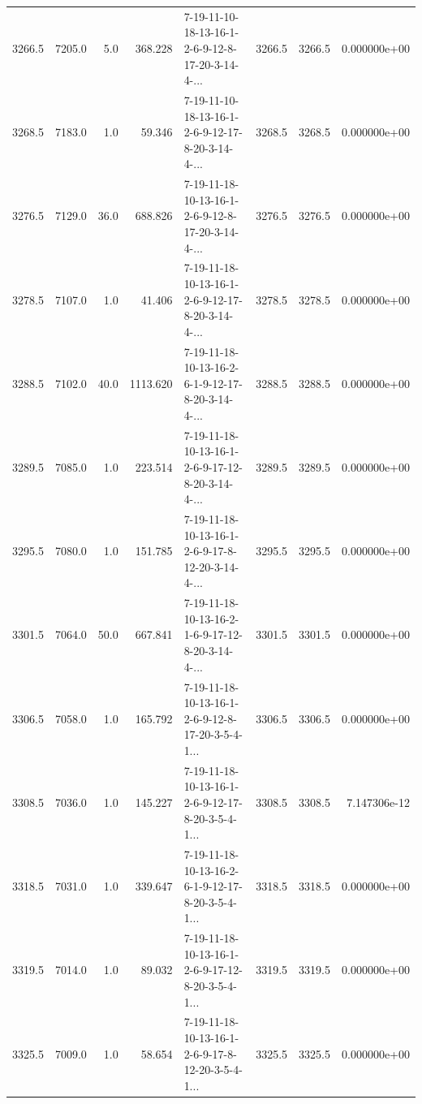 \begin{tabular}{rrrrlrrr}
 3266.5 &  7205.0 &            5.0 &            368.228 &  7-19-11-10-18-13-16-1-2-6-9-12-8-17-20-3-14-4-... &        3266.5 &          3266.5 &  0.000000e+00 \\
 3268.5 &  7183.0 &            1.0 &             59.346 &  7-19-11-10-18-13-16-1-2-6-9-12-17-8-20-3-14-4-... &        3268.5 &          3268.5 &  0.000000e+00 \\
 3276.5 &  7129.0 &           36.0 &            688.826 &  7-19-11-18-10-13-16-1-2-6-9-12-8-17-20-3-14-4-... &        3276.5 &          3276.5 &  0.000000e+00 \\
 3278.5 &  7107.0 &            1.0 &             41.406 &  7-19-11-18-10-13-16-1-2-6-9-12-17-8-20-3-14-4-... &        3278.5 &          3278.5 &  0.000000e+00 \\
 3288.5 &  7102.0 &           40.0 &           1113.620 &  7-19-11-18-10-13-16-2-6-1-9-12-17-8-20-3-14-4-... &        3288.5 &          3288.5 &  0.000000e+00 \\
 3289.5 &  7085.0 &            1.0 &            223.514 &  7-19-11-18-10-13-16-1-2-6-9-17-12-8-20-3-14-4-... &        3289.5 &          3289.5 &  0.000000e+00 \\
 3295.5 &  7080.0 &            1.0 &            151.785 &  7-19-11-18-10-13-16-1-2-6-9-17-8-12-20-3-14-4-... &        3295.5 &          3295.5 &  0.000000e+00 \\
 3301.5 &  7064.0 &           50.0 &            667.841 &  7-19-11-18-10-13-16-2-1-6-9-17-12-8-20-3-14-4-... &        3301.5 &          3301.5 &  0.000000e+00 \\
 3306.5 &  7058.0 &            1.0 &            165.792 &  7-19-11-18-10-13-16-1-2-6-9-12-8-17-20-3-5-4-1... &        3306.5 &          3306.5 &  0.000000e+00 \\
 3308.5 &  7036.0 &            1.0 &            145.227 &  7-19-11-18-10-13-16-1-2-6-9-12-17-8-20-3-5-4-1... &        3308.5 &          3308.5 &  7.147306e-12 \\
 3318.5 &  7031.0 &            1.0 &            339.647 &  7-19-11-18-10-13-16-2-6-1-9-12-17-8-20-3-5-4-1... &        3318.5 &          3318.5 &  0.000000e+00 \\
 3319.5 &  7014.0 &            1.0 &             89.032 &  7-19-11-18-10-13-16-1-2-6-9-17-12-8-20-3-5-4-1... &        3319.5 &          3319.5 &  0.000000e+00 \\
 3325.5 &  7009.0 &            1.0 &             58.654 &  7-19-11-18-10-13-16-1-2-6-9-17-8-12-20-3-5-4-1... &        3325.5 &          3325.5 &  0.000000e+00 \\

\end{tabular}
